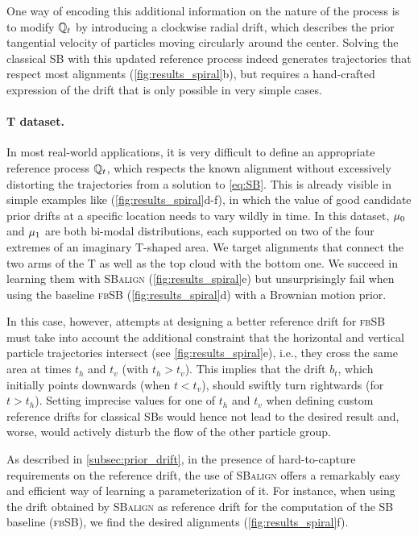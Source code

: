 One way of encoding this additional information on the nature of the process is to modify $\mathbb{Q}_{ t }$ by introducing a clockwise radial drift, which describes the prior tangential velocity of particles moving circularly around the center.
Solving the classical SB with this updated reference process indeed generates trajectories that respect most alignments (\cref{fig:results_spiral}b), but requires a hand-crafted expression of the drift that is only possible in very simple cases.

\paragraph{T dataset.}
In most real-world applications, it is very difficult to define an appropriate reference process $\mathbb{Q}_{ t }$, which respects the known alignment without excessively distorting the trajectories from a solution to \eqref{eq:SB}. This is already visible in simple examples like (\cref{fig:results_spiral}d-f), in which the value of good candidate prior drifts at a specific location needs to vary wildly in time.
In this dataset, $\mu_0$ and $\mu_1$ are both bi-modal distributions, each supported on two of the four extremes of an imaginary T-shaped area.
We target alignments that connect the two arms of the T as well as the top cloud with the bottom one. We succeed in learning them with \textsc{SBalign} (\cref{fig:results_spiral}e) but unsurprisingly fail when using the baseline \textsc{fbSB} (\cref{fig:results_spiral}d) with a Brownian motion prior.

 In this case, however, attempts at designing a better reference drift for \textsc{fbSB} must take into account the additional constraint that the horizontal and vertical particle trajectories intersect (see \cref{fig:results_spiral}e), i.e., they cross the same area at times $t_h$ and $t_v$ (with $t_h > t_v$). This implies that the drift $b_t$, which initially points downwards (when $t < t_v$), should swiftly turn rightwards (for $t > t_h$).
Setting imprecise values for one of $t_h$ and $t_v$ when defining custom reference drifts for classical SBs would hence not lead to the desired result and, worse, would actively disturb the flow of the other particle group.

 As described in \cref{subsec:prior_drift}, in the presence of hard-to-capture requirements on the reference drift, the use of \textsc{SBalign} offers a remarkably easy and efficient way of learning a parameterization of it. For instance, when using the drift obtained by \textsc{SBalign} as reference drift for the computation of the SB baseline (\textsc{fbSB}), we find the desired alignments (\cref{fig:results_spiral}f).

